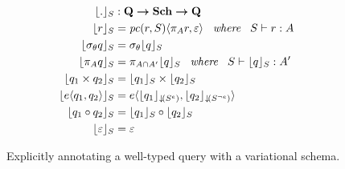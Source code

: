 \begin{figure}
\begin{alignat*}{1}
\constrain . &: \qSet \totype \vSchSet \totype \qSet\\
%
\constrain \vRel &= 
\chc [\getPCfrom {\vRel} \vSch] {\vPrj \vRel, \empRel}
\hspace{5pt} \textit{ where } \hspace{5pt}
\envWithoutVctx   {\vRel} {\vAttList}
\\
\constrain {\vSel \vQ}  &=  \vSel {\constrain \vQ}
\\
%
\constrain {\vPrj [\vAttList] \vQ} &= 
\vPrj [\vAttList \cap \VVal \vAttList] {\constrain \vQ}
\hspace{5pt} \textit{ where } \hspace{5pt}
\envWithoutVctx {{\constrain \vQ}} {\VVal \vAttList}
\\
%
\constrain {{\vQ_1} \times {\vQ_2}} &= 
\constrain {\vQ_1} \times \constrain {\vQ_2}
\\
%
%
\constrain {\chc {\vQ_1, \vQ_2}} &= 
\chc {\constrain [\pushIn {\annot [\dimMeta] \vSch}] {\vQ_1}, \constrain [\pushIn {\annot [\neg \dimMeta] \vSch}] {\vQ_2}}
\\
%
\constrain {{\vQ_1} \circ {\vQ_2}} &= 
\constrain {\vQ_1} \circ \constrain {\vQ_2}\\
%
\constrain {\empRel} &= \empRel
\end{alignat*}
\caption[Explicitly annotating a variational query with a variational schema]{
Explicitly annotating a well-typed query with a variational schema. 
}
\label{fig:constrain}
\end{figure}
